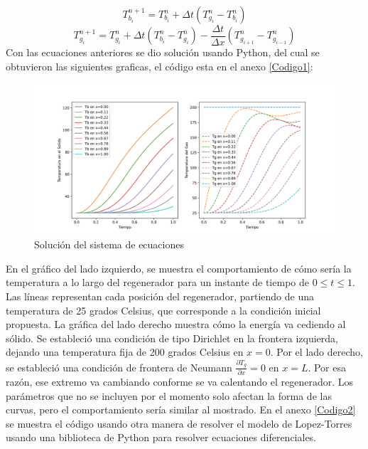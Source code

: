 \documentclass[12pt,letterpaper,final]{article}%
\begin{document}
\begin{equation*}
	T_{b_i}^{n + 1} =  T_{b_i}^{n} + \Delta t (T_{g_i}^n - T_{b_i}^n)
\end{equation*} 
\begin{equation*}
	T_{g_i}^{n + 1} = T_{g_i}^{n} + \Delta t(T_{b_i}^n - T_{g_i}^n) -   \frac{\Delta t}{\Delta x} ( T_{g_{i+1}}^n - T_{g_{i-1}}^n  )  
\end{equation*} 
  Con las ecuaciones anteriores se dio solución usando Python, del cual se obtuvieron las siguientes graficas, el código esta en el anexo \ref{Codigo1}:
  
  \begin{figure}[ht!]
  	\begin{center}
  		\includegraphics[scale=.6]{solucion.png}
  		\caption{Solución del sistema de ecuaciones}	
  	\end{center}	
  \end{figure}
  En el gráfico del lado izquierdo, se muestra el comportamiento de cómo sería la temperatura a lo largo del regenerador para un instante de tiempo de $0 \leq t \leq 1$. Las líneas representan cada posición del regenerador, partiendo de una temperatura de 25 grados Celsius, que corresponde a la condición inicial propuesta. La gráfica del lado derecho muestra cómo la energía va cediendo al sólido. Se estableció una condición de tipo Dirichlet en la frontera izquierda, dejando una temperatura fija de 200 grados Celsius en $x=0$. Por el lado derecho, se estableció una condición de frontera de Neumann $\frac{\partial T_g}{\partial x} = 0$ en $x=L$. Por esa razón, ese extremo va cambiando conforme se va calentando el regenerador. Los parámetros que no se incluyen por el momento solo afectan la forma de las curvas, pero el comportamiento sería similar al mostrado. 
  \newline
   En el anexo \ref{Codigo2} se muestra el código usando otra manera de resolver el modelo de Lopez-Torres usando una biblioteca de Python para resolver ecuaciones diferenciales.
  
\end{document}
